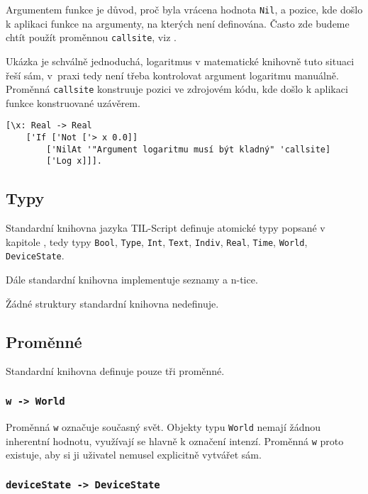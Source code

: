 Argumentem funkce je důvod, proč byla vrácena hodnota \lstinline{Nil}, a pozice, kde došlo
k aplikaci funkce na argumenty, na kterých není definována. Často zde budeme chtít použít proměnnou
\lstinline{callsite}, viz .

Ukázka je schválně jednoduchá, logaritmus v matematické knihovně tuto situaci řeší sám, v~praxi tedy
není třeba kontrolovat argument logaritmu manuálně. Proměnná \lstinline{callsite} konstruuje
pozici ve zdrojovém kódu, kde došlo k aplikaci funkce konstruované uzávěrem.

\begin{lstlisting}[caption={Ukázka využití NilAt}]
[\x: Real -> Real
    ['If ['Not ['> x 0.0]]
        ['NilAt '"Argument logaritmu musí být kladný" 'callsite]
        ['Log x]]].
\end{lstlisting}

\subsection{Typy}

Standardní knihovna jazyka TIL-Script definuje atomické typy popsané v kapitole
, tedy typy
\lstinline{Bool}, \lstinline{Type}, \lstinline{Int}, \lstinline{Text}, \lstinline{Indiv},
\lstinline{Real}, \lstinline{Time}, \lstinline{World}, \lstinline{DeviceState}.

Dále standardní knihovna implementuje seznamy a n-tice.

Žádné struktury standardní knihovna nedefinuje.

\subsection{Proměnné}

Standardní knihovna definuje pouze tři proměnné.

\subsubsection{\lstinline{w -> World}}

Proměnná \lstinline{w} označuje současný svět. Objekty typu \lstinline{World} nemají žádnou
inherentní hodnotu, využívají se hlavně k označení intenzí. Proměnná \lstinline{w} proto existuje,
aby si ji uživatel nemusel explicitně vytvářet sám.

\subsubsection{\lstinline{deviceState -> DeviceState}}

